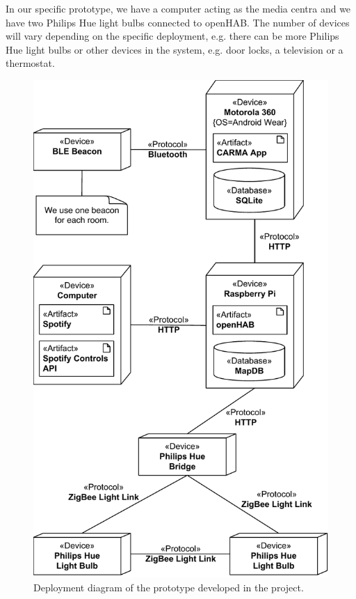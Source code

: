 In our specific prototype, we have a computer acting as the media centra and we have two Philips Hue light bulbs connected to openHAB. The number of devices will vary depending on the specific deployment, e.g. there can be more Philips Hue light bulbs or other devices in the system, e.g. door locks, a television or a thermostat.

\begin{figure}[h!]
\centering
\includegraphics[height=\textheight]{images/deployment-diagram}
\caption{Deployment diagram of the prototype developed in the project.}
\label{fig:implementation:deployment-diagram}
\end{figure}

